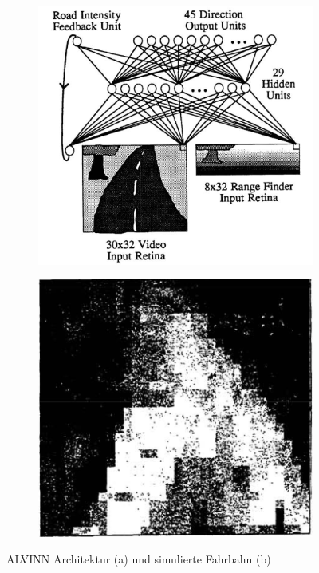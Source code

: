 \begin{figure}
	\centering
	\begin{subfigure}{.5\textwidth}
	\centering
		  \includegraphics[width=.85\linewidth]{figures/Architecture-ALVINN.png}
		  \caption{}
		  \label{img:ALVINNa}
	\end{subfigure}%
	\begin{subfigure}{.5\textwidth}
	\centering
		  \includegraphics[width=.85\linewidth]{figures/Strasse-ALVINN.png}
	 	  \caption{}
		  \label{img:ALVINNb}
	\end{subfigure}%
	\caption{ALVINN Architektur (a) und simulierte Fahrbahn (b)}
	\label{img:ALVINN}
\end{figure}

